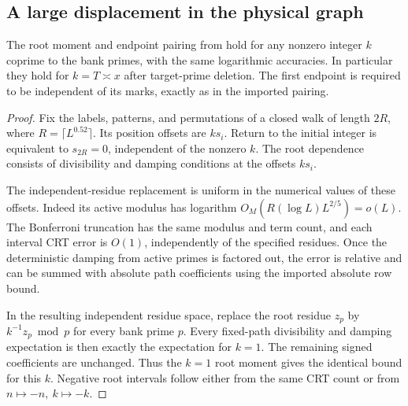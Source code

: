 \subsection{A large displacement in the physical graph}

\begin{lemma}\label{lem:gr-large}
The root moment and endpoint pairing from
\cite[Theorem~3.5 and Corollary~3.11]{weightedgraphs} hold for any
nonzero integer \(k\) coprime to the bank primes, with the same
logarithmic accuracies.  In particular they hold for \(k=T\asymp x\)
after target-prime deletion.  The first endpoint is required to be
independent of its marks, exactly as in the imported pairing.
\end{lemma}

\begin{proof}
Fix the labels, patterns, and permutations of a closed walk of length
\(2R\), where \(R=\lceil L^{0.52}\rceil\).
Its position offsets are \(ks_i\).  Return to the initial integer
is equivalent to \(s_{2R}=0\), independent of the nonzero \(k\).
The root dependence consists of divisibility and damping conditions
at the offsets \(ks_i\).

The independent-residue replacement
\cite[Lemma~3.6]{weightedgraphs} is uniform in the numerical values
of these offsets.  Indeed its active modulus has logarithm
\(O_M(R(\log L)L^{2/5})=o(L)\).
The Bonferroni truncation has the same modulus and term count,
and each interval CRT error is \(O(1)\), independently of the
specified residues.  Once the deterministic damping from active
primes is factored out, the error is relative and can be summed with
absolute path coefficients using the imported absolute row bound.

In the resulting independent residue space, replace the root residue
\(z_p\) by \(k^{-1}z_p\bmod p\) for every bank prime \(p\).
Every fixed-path divisibility and damping expectation is then exactly
the expectation for \(k=1\).
The remaining signed coefficients are unchanged.
Thus the \(k=1\) root moment gives the identical bound for this \(k\).
Negative root intervals follow either from the same CRT count or
from \(n\mapsto-n,\ k\mapsto-k\).


\end{proof}
